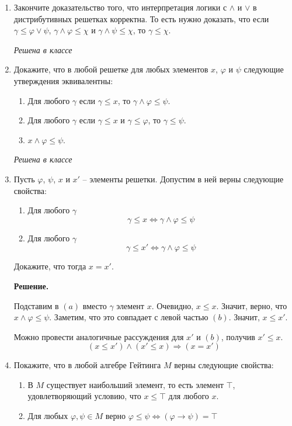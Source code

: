 \begin{enumerate}

\item Закончите доказательство того, что интерпретация логики с $\land$ и $\lor$ в дистрибутивных решетках 
корректна.
    То есть нужно доказать, что если $\gamma \leq \varphi \lor \psi$, $\gamma \land \varphi \leq \chi$ и $\gamma \land \psi \leq \chi$, то $\gamma \leq \chi$.
    
    \textit{Решена в классе}

\item Докажите, что в любой решетке для любых элементов $x$, $\varphi$ и $\psi$ следующие утверждения эквивалентны:
\begin{enumerate}
\item Для любого $\gamma$ если $\gamma \leq x$, то $\gamma \land \varphi \leq \psi$.
\item Для любого $\gamma$ если $\gamma \leq x$ и $\gamma \leq \varphi$, то $\gamma \leq \psi$.
\item $x \land \varphi \leq \psi$.
\end{enumerate}

\textit{Решена в классе}

\item Пусть $\varphi$, $\psi$, $x$ и $x'$ -- элементы решетки. Допустим в ней верны следующие свойства:
\begin{enumerate}
\item Для любого $\gamma$
    \[ \gamma \leq x \Leftrightarrow \gamma \land \varphi \leq \psi \]
\item Для любого $\gamma$
    \[ \gamma \leq x' \Leftrightarrow \gamma \land \varphi \leq \psi \]
\end{enumerate}
Докажите, что тогда $x = x'$.

\textbf{Решение.} 

Подставим в $(a)$ вместо $\gamma$ элемент $x$. Очевидно, $x \leq x$. Значит, верно, что $x \land \varphi \leq 
\psi$. Заметим, что это совпадает с левой частью $(b)$. Значит, $x \leq x'$.

Можно провести аналогичные рассуждения для $x'$ и $(b)$, получив $x' \leq x$. 
\begin{equation*}
	(x \leq x') \land (x' \leq x) \Rightarrow (x = x')
\end{equation*}

\item Покажите, что в любой алгебре Гейтинга $M$ верны следующие свойства:
\begin{enumerate}
\item В $M$ существует наибольший элемент, то есть элемент $\top$, удовлетворяющий условию, что $x \leq \top$ для 
любого $x$.
\item Для любых $\varphi, \psi \in M$ верно $\varphi \leq \psi \Leftrightarrow (\varphi \to \psi) = \top$
\end{enumerate}


\end{enumerate}
